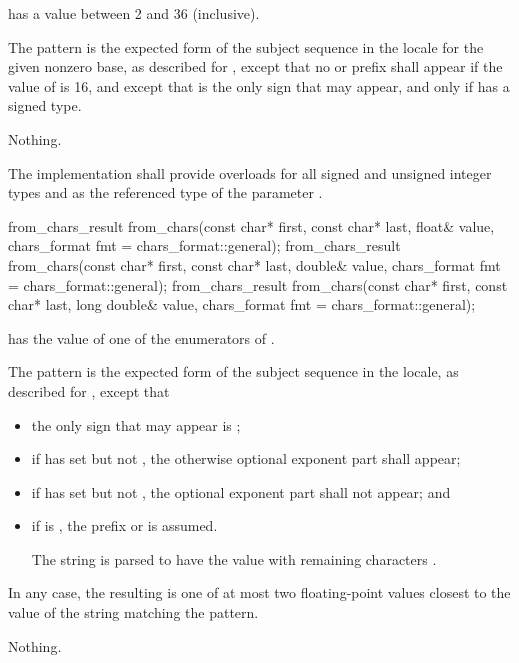 \begin{itemdescr}
\pnum
\requires {} has a value between 2 and 36 (inclusive).

\pnum
\effects The pattern is the expected form of the subject sequence
in the  locale
for the given nonzero base,
as described for ,
except that no  or  prefix shall appear
if the value of  is 16,
and except that 
is the only sign that may appear,
and only if  has a signed type.

\pnum
\throws Nothing.

\pnum
\remarks
The implementation shall provide overloads
for all signed and unsigned integer types
and 
as the referenced type of the parameter .
\end{itemdescr}

%
\begin{itemdecl}
from_chars_result from_chars(const char* first, const char* last, float& value,
                             chars_format fmt = chars_format::general);
from_chars_result from_chars(const char* first, const char* last, double& value,
                             chars_format fmt = chars_format::general);
from_chars_result from_chars(const char* first, const char* last, long double& value,
                             chars_format fmt = chars_format::general);
\end{itemdecl}

\begin{itemdescr}
\pnum
\requires {} has the value of
one of the enumerators of .

\pnum
\effects The pattern is the expected form of the subject sequence
in the  locale,
as described for ,
except that
\begin{itemize}
\item
the only sign that may appear is ;
\item
if  has  set
but not ,
the otherwise optional exponent part shall appear;
\item
if  has  set
but not ,
the optional exponent part shall not appear; and
\item
if  is ,
the prefix  or  is assumed.
\begin{example}
The string 
is parsed to have the value
with remaining characters .
\end{example}
\end{itemize}
In any case, the resulting  is one of
at most two floating-point values
closest to the value of the string matching the pattern.

\pnum
\throws Nothing.
\end{itemdescr}

